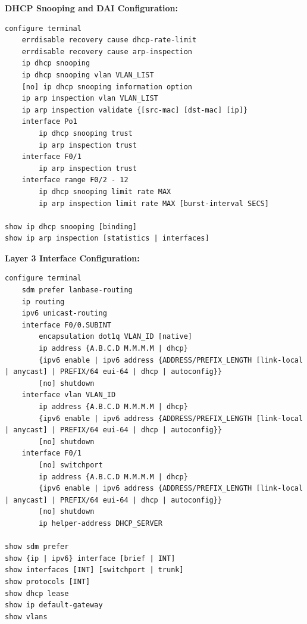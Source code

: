 \documentclass[12pt]{article}
\begin{document}
	\textbf{DHCP Snooping and DAI Configuration:}
	\begin{lstlisting}
configure terminal
	errdisable recovery cause dhcp-rate-limit
	errdisable recovery cause arp-inspection
	ip dhcp snooping
	ip dhcp snooping vlan VLAN_LIST
	[no] ip dhcp snooping information option
	ip arp inspection vlan VLAN_LIST
	ip arp inspection validate {[src-mac] [dst-mac] [ip]}
	interface Po1
		ip dhcp snooping trust
		ip arp inspection trust
	interface F0/1
		ip arp inspection trust
	interface range F0/2 - 12
		ip dhcp snooping limit rate MAX
		ip arp inspection limit rate MAX [burst-interval SECS]

show ip dhcp snooping [binding]
show ip arp inspection [statistics | interfaces]
	\end{lstlisting}

	\textbf{Layer 3 Interface Configuration:}
	\begin{lstlisting}
configure terminal
	sdm prefer lanbase-routing
	ip routing
	ipv6 unicast-routing
	interface F0/0.SUBINT
		encapsulation dot1q VLAN_ID [native]
		ip address {A.B.C.D M.M.M.M | dhcp}
		{ipv6 enable | ipv6 address {ADDRESS/PREFIX_LENGTH [link-local | anycast] | PREFIX/64 eui-64 | dhcp | autoconfig}}
		[no] shutdown
	interface vlan VLAN_ID
		ip address {A.B.C.D M.M.M.M | dhcp}
		{ipv6 enable | ipv6 address {ADDRESS/PREFIX_LENGTH [link-local | anycast] | PREFIX/64 eui-64 | dhcp | autoconfig}}
		[no] shutdown
	interface F0/1
		[no] switchport
		ip address {A.B.C.D M.M.M.M | dhcp}
		{ipv6 enable | ipv6 address {ADDRESS/PREFIX_LENGTH [link-local | anycast] | PREFIX/64 eui-64 | dhcp | autoconfig}}
		[no] shutdown
		ip helper-address DHCP_SERVER

show sdm prefer
show {ip | ipv6} interface [brief | INT]
show interfaces [INT] [switchport | trunk]
show protocols [INT]
show dhcp lease
show ip default-gateway
show vlans
	\end{lstlisting}
\end{document}
